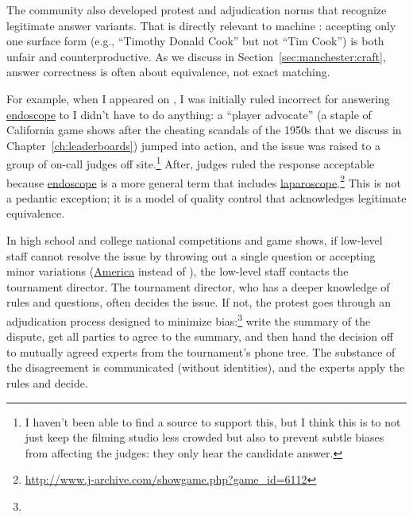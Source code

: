 
The community also developed protest and adjudication norms that recognize
legitimate answer variants. That is directly relevant to machine :
accepting only one surface form (e.g., ``Timothy Donald Cook'' but not ``Tim
Cook'') is both unfair and counterproductive. As we discuss in
Section~\ref{sec:manchester:craft}, answer correctness is often about
equivalence, not exact matching.

For example, when I appeared on \jeopardy{}, I was initially ruled
incorrect for answering \underline{endoscope} to   I didn't have to do anything: a ``player
advocate'' (a staple of California game shows after the cheating
scandals of the 1950s that we discuss in
Chapter~\ref{ch:leaderboards}) jumped into action, and the issue was raised to a group of on-call judges off site.\footnote{I haven't been able to find a source to support this, but I think this is to not just keep the filming studio less crowded but also to prevent subtle biases from affecting the judges: they only hear the candidate answer.}
\jbgcomment{Ping Clair McNair for her take on this %
}
After, judges ruled the response acceptable because \underline{endoscope} is a
more general term that includes \underline{laparoscope}.\footnote{\url{http://www.j-archive.com/showgame.php?game_id=6112}}
This is not a pedantic exception; it is a model of quality control that
acknowledges legitimate equivalence.


In high school and college national competitions and game shows,
if low-level staff cannot resolve the issue by throwing out a single
question or accepting minor variations (\underline{America} instead of
\underline{}), the low-level staff contacts the tournament
director.
The tournament director, who has a deeper knowledge of rules and
questions, often decides the issue.
If not, the protest goes
through an adjudication process designed to minimize
bias:\footnote{}
write the summary of the dispute,
get all parties to agree to the summary,
and then hand the decision off to mutually agreed experts from the tournament's phone tree.
The substance of the disagreement is communicated (without identities), and the experts apply the rules and decide.

